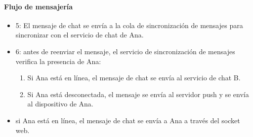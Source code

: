 \paragraph{Flujo de mensajería}
\begin{itemize}
	\item  5: El mensaje de chat se envía a la cola de sincronización de mensajes para sincronizar con el servicio de chat de Ana.
	\item 6: antes de reenviar el mensaje, el servicio de sincronización de mensajes verifica la presencia de Ana:
	 	\begin{enumerate}
	 		\item   Si Ana está en línea, el mensaje de chat se envía al servicio de chat B.
	 		\item Si Ana está desconectada, el mensaje se envía al servidor push y se envía al dispositivo de Ana.
	 	\end{enumerate}	
	\item  si Ana está en línea, el mensaje de chat se envía a Ana a través del socket web.
\end{itemize}
 






